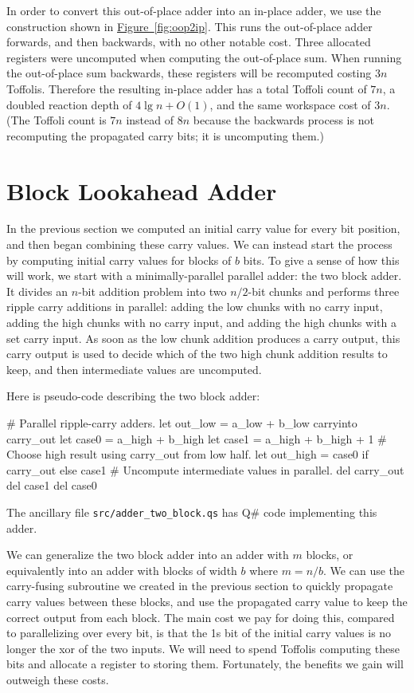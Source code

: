 \documentclass[onecolumn,unpublished]{quantumarticle}
\theoremstyle{definition}
\theoremstyle{definition}
\theoremstyle{definition}
\newcommand{\fig}[1]{\hyperref[fig:#1]{Figure~\ref*{fig:#1}}}
\begin{document}
In order to convert this out-of-place adder into an in-place adder, we use the construction shown in \fig{oop2ip}.
This runs the out-of-place adder forwards, and then backwards, with no other notable cost.
Three allocated registers were uncomputed when computing the out-of-place sum.
When running the out-of-place sum backwards, these registers will be recomputed costing $3n$ Toffolis.
Therefore the resulting in-place adder has a total Toffoli count of $7n$, a doubled reaction depth of $4 \lg n + O(1)$, and the same workspace cost of $3n$.
(The Toffoli count is $7n$ instead of $8n$ because the backwards process is not recomputing the propagated carry bits; it is uncomputing them.)

\section{Block Lookahead Adder}
\label{sec:block}

In the previous section we computed an initial carry value for every bit position, and then began combining these carry values.
We can instead start the process by computing initial carry values for blocks of $b$ bits.
To give a sense of how this will work, we start with a minimally-parallel parallel adder: the two block adder.
It divides an $n$-bit addition problem into two $n/2$-bit chunks and performs three ripple carry additions in parallel: adding the low chunks with no carry input, adding the high chunks with no carry input, and adding the high chunks with a set carry input.
As soon as the low chunk addition produces a carry output, this carry output is used to decide which of the two high chunk addition results to keep, and then intermediate values are uncomputed.

Here is pseudo-code describing the two block adder:

\begin{python}
    # Parallel ripple-carry adders.
    let out_low = a_low + b_low carryinto carry_out
    let case0 = a_high + b_high
    let case1 = a_high + b_high + 1
    # Choose high result using carry_out from low half.
    let out_high = case0 if carry_out else case1
    # Uncompute intermediate values in parallel.
    del carry_out
    del case1
    del case0
\end{python}

The ancillary file \texttt{src/adder\_two\_block.qs} has Q\# code implementing this adder.

We can generalize the two  block adder into an adder with $m$ blocks, or equivalently into an adder with blocks of width $b$ where $m=n/b$.
We can use the carry-fusing subroutine we created in the previous section to quickly propagate carry values between these blocks, and use the propagated carry value to keep the correct output from each block.
The main cost we pay for doing this, compared to parallelizing over every bit, is that the 1s bit of the initial carry values is no longer the xor of the two inputs.
We will need to spend Toffolis computing these bits and allocate a register to storing them.
Fortunately, the benefits we gain will outweigh these costs.
\end{document}
